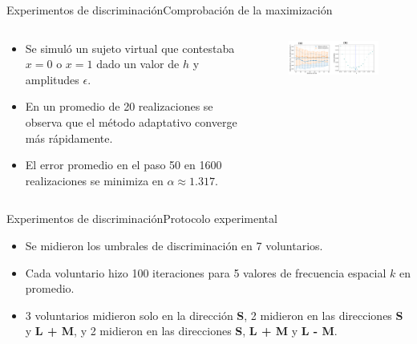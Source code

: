 \documentclass[
    11pt, %
    aspectratio=169, %
]{beamer}
\begin{document}
\begin{frame}{Experimentos de discriminación}{Comprobación de la maximización}

\begin{columns}[c] %

    
		\begin{column}{0.40\textwidth}

    \begin{itemize}
        \item Se simuló un sujeto virtual que contestaba $x = 0$ o $x = 1$ dado un valor de $h$ y amplitudes $\epsilon$.
        \item En un promedio de 20 realizaciones se observa que el método adaptativo converge más rápidamente.
        \item El error promedio en el paso 50 en 1600 realizaciones se minimiza en $\alpha \approx 1.317$.
    \end{itemize}

          
 
               
		\end{column}
  		\begin{column}{0.60\textwidth} %
                 \begin{figure}[h!]
                    \centering
                    \includegraphics[angle=0, width=9.0cm]{Images/experimental/comparacion_y_alfas.pdf}
                \end{figure}
		\end{column}		
	\end{columns}
    
\end{frame}
\begin{frame}{Experimentos de discriminación}{Protocolo experimental}
    \begin{itemize}
        \item Se midieron los umbrales de discriminación en 7 voluntarios. \pause
        \item Cada voluntario hizo 100 iteraciones para 5 valores de frecuencia espacial $k$ en promedio. \pause
        \item 3 voluntarios midieron solo en la dirección \textbf{S}, 2 midieron en las direcciones \textbf{S} y \textbf{L + M},
            y 2 midieron en las direcciones \textbf{S}, \textbf{L + M} y \textbf{L - M}. 
    \end{itemize}
\end{frame}
\end{document}

